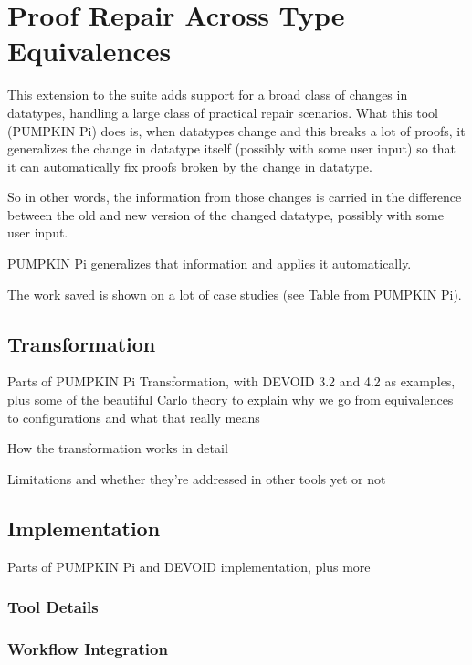 \chapter{Proof Repair Across Type Equivalences}
\label{chapt:pi}

This extension to the suite adds support for a broad class of changes in datatypes, handling a large class of practical repair scenarios.
What this tool (PUMPKIN Pi) does is, when datatypes change and this breaks a lot of proofs, it generalizes the change in datatype itself (possibly with some user input) so that it can automatically fix proofs broken by the change in datatype. 

So in other words, the information from those changes is carried in the difference between the old and new version of the changed datatype, possibly with some user input.

PUMPKIN Pi generalizes that information and applies it automatically.

The work saved is shown on a lot of case studies (see Table from PUMPKIN Pi).







\section{Transformation}

Parts of PUMPKIN Pi Transformation, with DEVOID 3.2 and 4.2 as examples, plus some of the beautiful Carlo theory to explain why we go from equivalences to configurations and what that really means

How the transformation works in detail

Limitations and whether they're addressed in other tools yet or not

\section{Implementation}

Parts of PUMPKIN Pi and DEVOID implementation, plus more

\subsection{Tool Details}

\subsection{Workflow Integration}

